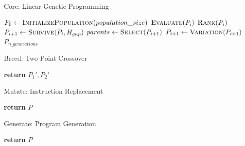 \documentclass[12pt, final]{dalcsthesis}
\begin{document}
\begin{algorithm}[hb]
  \caption{Core: Linear Genetic Programming}
  \label{alg:core}
  \begin{algorithmic}[1]
    \State $P_{0} \gets \Call{InitializePopulation}{population\_size}$
      \State $\Call{Evaluate}{P_{i}}$
      \State $\Call{Rank}{P_{i}}$
      \State $P_{i+1} \gets \Call{Survive}{P_{i}, H_{gap}}$
      \State $parents \gets \Call{Select}{P_{i+1}}$
      \State $P_{i+1} \gets \Call{Variation}{P_{i+1}}$
    \EndFor
    \State \Return $P_{n\_generations}$
  \end{algorithmic}
\end{algorithm}

\begin{algorithm}[hb]
	\caption{Breed: Two-Point Crossover}
	\label{alg:breed}
	\begin{algorithmic}[1]
		\State \textbf{return} $P_1', P_2'$
	\end{algorithmic}
\end{algorithm}

\begin{algorithm}[hb]
	\caption{Mutate: Instruction Replacement}
	\label{alg:mutate}
	\begin{algorithmic}[1]
		\EndIf
		\EndFor
		\State \textbf{return} $P$
	\end{algorithmic}
\end{algorithm}

\begin{algorithm}[hb]
	\caption{Generate: Program Generation}
	\label{alg:generate}
	\begin{algorithmic}[1]
		\State \textbf{return} $P$
	\end{algorithmic}
\end{algorithm}
\end{document}
